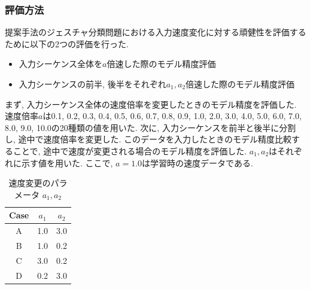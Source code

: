 \subsubsection{評価方法}
提案手法のジェスチャ分類問題における入力速度変化に対する頑健性を評価するために以下の2つの評価を行った.
\begin{itemize}
    \item 入力シーケンス全体を$a$倍速した際のモデル精度評価
    \item 入力シーケンスの前半, 後半をそれぞれ$a_1, a_2$倍速した際のモデル精度評価
\end{itemize}
まず, 入力シーケンス全体の速度倍率を変更したときのモデル精度を評価した.
速度倍率$a$は0.1, 0.2, 0.3, 0.4, 0.5, 0.6, 0.7, 0.8, 0.9, 1.0, 2.0, 3.0, 4.0, 5.0, 6.0, 7.0, 8.0, 9.0, 10.0の20種類の値を用いた.
次に, 入力シーケンスを前半と後半に分割し, 途中で速度倍率を変更した.
このデータを入力したときのモデル精度比較することで, 途中で速度が変更される場合のモデル精度を評価した.
$a_1, a_2$はそれぞれに示す値を用いた.
ここで, $a=1.0$は学習時の速度データである.

\begin{table}[htbp]
    \centering
    \caption{速度変更のパラメータ $a_1, a_2$}
    \label{tab:model:parameter:speed:change}
    \begin{tabular}{ccc}
        \hline
        \textbf{Case}& $a_1$ & $a_2$\\
        \hline
        A&1.0&3.0\\
        B&1.0&0.2\\
        C&3.0&0.2\\
        D&0.2&3.0\\
        \hline
    \end{tabular}
\end{table}
